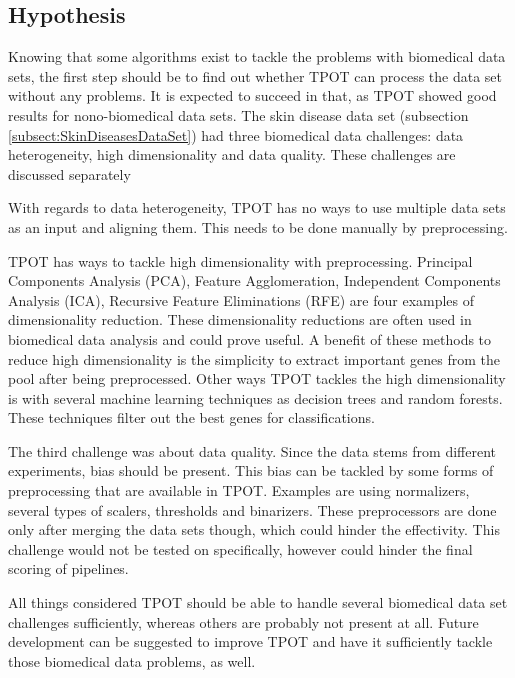 \documentclass[10pt,a4paper]{article}
\begin{document}
	\subsection{Hypothesis}
	\label{subsec:Hypothesis}
	
	Knowing that some algorithms exist to tackle the problems with biomedical data sets, the first step should be to find out whether TPOT can process the data set without any problems. It is expected to succeed in that, as TPOT showed good results for nono-biomedical data sets. The skin disease data set (subsection \ref{subsect:SkinDiseasesDataSet}) had three biomedical data challenges: data heterogeneity, high dimensionality and data quality. These challenges are discussed separately

	With regards to data heterogeneity, TPOT has no ways to use multiple data sets as an input and aligning them. This needs to be done manually by preprocessing. 
	
	TPOT has ways to tackle high dimensionality with preprocessing. Principal Components Analysis (PCA), Feature Agglomeration, Independent Components Analysis (ICA), Recursive Feature Eliminations (RFE) are four examples of dimensionality reduction. These dimensionality reductions are often used in biomedical data analysis and could prove useful. A benefit of these methods to reduce high dimensionality is the simplicity to extract important genes from the pool after being preprocessed. Other ways TPOT tackles the high dimensionality is with several machine learning techniques as decision trees and random forests. These techniques filter out the best genes for classifications.
	
	The third challenge was about data quality. Since the data stems from different experiments, bias should be present. This bias can be tackled by some forms of preprocessing that are available in TPOT. Examples are using normalizers, several types of scalers, thresholds and binarizers. These preprocessors are done only after merging the data sets though, which could hinder the effectivity. This challenge would not be tested on specifically, however could hinder the final scoring of pipelines.
	
	All things considered TPOT should be able to handle several biomedical data set challenges sufficiently, whereas others are probably not present at all. Future development can be suggested to improve TPOT and have it sufficiently tackle those biomedical data problems, as well.
	
\end{document}
